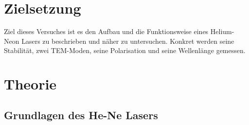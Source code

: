 \section{Zielsetzung}
\label{sec:Ziel}

Ziel dieses Versuches ist es den Aufbau und die Funktionsweise eines Helium-Neon Lasers zu beschrieben und näher zu untersuchen.
Konkret werden seine Stabilität, zwei TEM-Moden, seine Polarisation und seine Wellenlänge gemessen.

\section{Theorie}
\label{sec:Theorie}


\subsection{Grundlagen des He-Ne Lasers}

